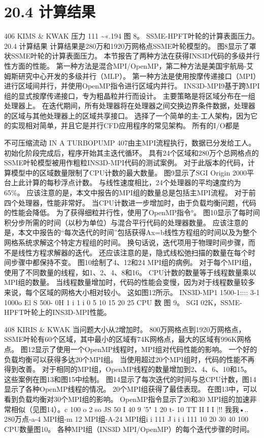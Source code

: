 \documentclass[UTF8,11pt,a4paper,openany,fontset=fandol]{ctexbook}
\begin{document}
\section{20.4 计算结果}
406 KIMS \& KWAK 压力 111 \textasciitilde{}«.194 图 8。 SSME-HPFT叶轮的计算表面压力。 20.4 计算结果 计算结果是280万和1920万网格点SSME叶轮模型的。 图8显示了罩状SSME叶轮的计算表面压力。 本节报告了两种方法在获得INS3D代码的多级并行性方面的性能。 第一种方法是混合MPI/OpenMP，第二种方法是美国宇航局-艾姆斯研究中心开发的多级并行（MLP）。 第一种方法是使用按摩传递接口（MPI）进行区域间并行，并使用OpenMP指令进行区域内并行。 INS3D-MPI9基于跨MPI组的显式按摩传递接口，专为粗晶粒并行而设计。 主要策略是将区域分布在一组处理器上。 在迭代期间，所有处理器将在处理器之间交换边界条件数据，处理器的区域与其他处理器上的区域共享接口。 选择了一个简单的主-工人架构，因为它的实现相对简单，并且它是并行CFD应用程序的常见架构。 所有的I/O都是

不可压缩流动 IN A TURBOPUMP 407由主MPI流程执行，数据已分发给工人。 初始化阶段完成后，程序开始其主迭代循环。 具有24个区域和280万个总网格点的SSME叶轮模型被用作粗粒INS3D-MPI代码的测试案例。 对于此版本的代码，计算模型中的区域数量限制了CPU计数的最大数量。 图9显示了SGI Origin 2000平台上此计算的每秒浮点计数。 与线性速度相比，24个处理器的平均速度约为65\%。 应该注意的是，本文中报告的MPI组的数量总是包括主MPI流程。 对于前四个处理器，性能非常好。 当CPU计数进一步增加时，由于负载均衡问题，代码的性能会降低。 为了获得细粒并行性，使用了OpenMP指令°。 图10显示了每时间积分步所需的时间（以秒为单位）与混合平行代码的处理器数量。 应该注意的是，本文中报告的“每次迭代的时间”包括获得Ax=b线性方程组的时间以及为整个网格系统求解这个特定方程组的时间。 换句话说，迭代项用于物理时间步骤，而不是线性方程求解器的迭代。 还应该注意的是，隐式线松弛扫描的数量在每个时间步骤中都保持不变。 图10绘制了4、12和24 MPI组的病例。 对于每个MPI组，使用了不同数量的线程，如1、2、4、8和16。 CPU计数的数量等于线程数量乘以MPI组的数量。 当线程数量增加时，代码的性能会变慢，因为对于线程数量较多来说，每个区域的网格大小相对较小。 这如图12所示。 INS3D-MP1 1500-1:::: 3-1 1000o El S 500- 0H 1 i 1 i 0 5 10 15 20 25 CPU 数 图 9。 SGI 02K，SSME-HPFT叶轮上的INS3D-MPI性能。

408 KIRIS \& KWAK 当问题大小从2增加时。 800万网格点到1920万网格点，SSME叶轮有60个区域，其中最小的区域有74K网格点，最大的区域有996K网格点。 图12显示了使用一个OpenMP线程时，MPI组对代码性能的影响。 一个好的负载均衡可以获得多达20个MPI组。 当使用超过20个MPI组时，代码的性能不再得到改善。 对于相同的MPI组，OpenMP线程的数量增加到2、4、6、10和15。 这些案例在图13和图15中绘制。 图14显示了每次迭代的时间与总CPU计数，图14显示了各种OpenMP线程的情况。 20个MPI组获得了最佳表现。 在图13中，可以看到负载均衡对30个MPI组的影响。 OpenMP指令显示了20和30 MPI组的加速非常相似（见图14）。c 100 o 2 so JS 50 I 40 9 '5" 1 20 t- 10 TT II I I |!! 我我•.. 280万点-a-4 MPI组-m 12 MPI组-A-24 MPI组i i 111 J i i i 111 10 20 30 40 100 CPU数量图10。 各种MPI组（INS3D MPI/OpenMP）的每个迭代步骤的时间。
\end{document}
